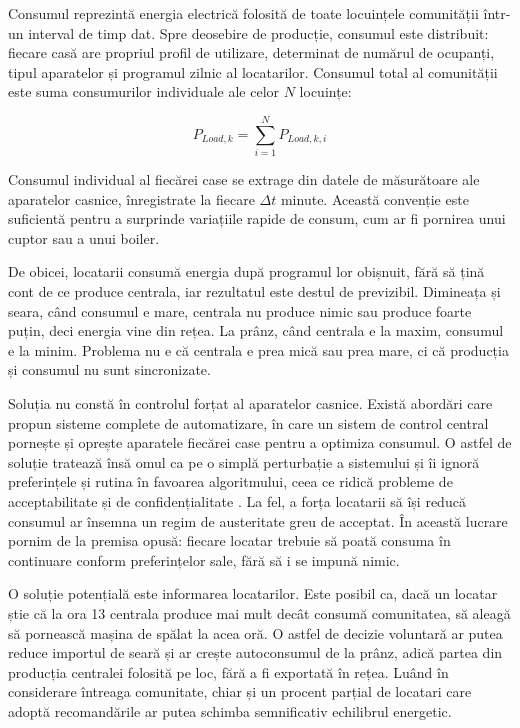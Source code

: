 \documentclass[12pt,a4paper]{report}
\begin{document}
Consumul reprezintă energia electrică folosită de toate locuințele comunității într-un interval de timp dat. Spre deosebire de producție, consumul este distribuit: fiecare casă are propriul profil de utilizare, determinat de numărul de ocupanți, tipul aparatelor și programul zilnic al locatarilor. Consumul total al comunității este suma consumurilor individuale ale celor $N$ locuințe:

\begin{equation}
  P_{Load,k} = \sum_{i=1}^{N} P_{Load,k,i}
  \label{eq:consum}
\end{equation}

Consumul individual al fiecărei case se extrage din datele de măsurătoare ale aparatelor casnice, înregistrate la fiecare $\Delta t$ minute. Această convenție este suficientă pentru a surprinde variațiile rapide de consum, cum ar fi pornirea unui cuptor sau a unui boiler.

De obicei, locatarii consumă energia după programul lor obișnuit, fără să țină cont de ce produce centrala, iar rezultatul este destul de previzibil. Dimineața și seara, când consumul e mare, centrala nu produce nimic sau produce foarte puțin, deci energia vine din rețea. La prânz, când centrala e la maxim, consumul e la minim. Problema nu e că centrala e prea mică sau prea mare, ci că producția și consumul nu sunt sincronizate.

Soluția nu constă în controlul forțat al aparatelor casnice. Există abordări care propun sisteme complete de automatizare, în care un sistem de control central pornește și oprește aparatele fiecărei case pentru a optimiza consumul. O astfel de soluție tratează însă omul ca pe o simplă perturbație a sistemului și îi ignoră preferințele și rutina în favoarea algoritmului, ceea ce ridică probleme de acceptabilitate și de confidențialitate \cite{simoiu2022renewable}. La fel, a forța locatarii să își reducă consumul ar însemna un regim de austeritate greu de acceptat. În această lucrare pornim de la premisa opusă: fiecare locatar trebuie să poată consuma în continuare conform preferințelor sale, fără să i se impună nimic.

O soluție potențială este informarea locatarilor. Este posibil ca, dacă un locatar știe că la ora 13 centrala produce mai mult decât consumă comunitatea, să aleagă să pornească mașina de spălat la acea oră. O astfel de decizie voluntară ar putea reduce importul de seară și ar crește autoconsumul de la prânz, adică partea din producția centralei folosită pe loc, fără a fi exportată în rețea. Luând în considerare întreaga comunitate, chiar și un procent parțial de locatari care adoptă recomandările ar putea schimba semnificativ echilibrul energetic.
\end{document}
